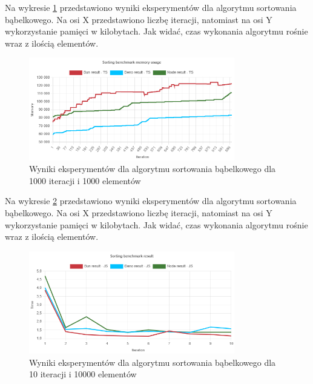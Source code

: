 Na wykresie \ref{fig:bubble_sorting_e3_memory_ts} przedstawiono wyniki eksperymentów dla algorytmu sortowania bąbelkowego. Na osi X przedstawiono liczbę iteracji, natomiast na osi Y wykorzystanie pamięci w kilobytach. Jak widać, czas wykonania algorytmu rośnie wraz z ilością elementów.
\begin{figure}[H]
  \centering
  \includegraphics[width=0.8\textwidth]{Figures/sorting/bubble/e3_memory_ts.png}
  \caption{Wyniki eksperymentów dla algorytmu sortowania bąbelkowego dla 1000 iteracji i 1000 elementów}
  \label{fig:bubble_sorting_e3_memory_ts}
\end{figure}

Na wykresie \ref{fig:bubble_sorting_e4} przedstawiono wyniki eksperymentów dla algorytmu sortowania bąbelkowego. Na osi X przedstawiono liczbę iteracji, natomiast na osi Y wykorzystanie pamięci w kilobytach. Jak widać, czas wykonania algorytmu rośnie wraz z ilością elementów.
\begin{figure}[H]
  \centering
  \includegraphics[width=0.8\textwidth]{Figures/sorting/bubble/e4_js.png}
  \caption{Wyniki eksperymentów dla algorytmu sortowania bąbelkowego dla 10 iteracji i 10000 elementów}
  \label{fig:bubble_sorting_e4}
\end{figure}

